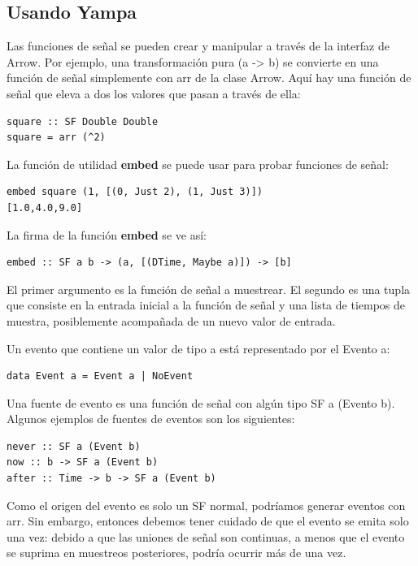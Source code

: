 \subsection{Usando Yampa}

Las funciones de señal se pueden crear y manipular a través de la interfaz de Arrow. Por ejemplo, una transformación pura (a -> b) se convierte en una función de señal simplemente con arr de la clase Arrow. Aquí hay una función de señal que eleva a dos los valores que pasan a través de ella:

\begin{lstlisting}[frame=single]
square :: SF Double Double
square = arr (^2)
\end{lstlisting}

La función de utilidad \textbf{embed}  se puede usar para probar funciones de señal:

\begin{lstlisting}[frame=single]
embed square (1, [(0, Just 2), (1, Just 3)])
[1.0,4.0,9.0]
\end{lstlisting}

La firma de la función \textbf{embed} se ve así:

\begin{lstlisting}[frame=single]
embed :: SF a b -> (a, [(DTime, Maybe a)]) -> [b]
\end{lstlisting}

El primer argumento es la función de señal a muestrear. El segundo es una tupla que consiste en la entrada inicial a la función de señal y una lista de tiempos de muestra, posiblemente acompañada de un nuevo valor de entrada.

Un evento que contiene un valor de tipo a está representado por el Evento a:

\begin{lstlisting}[frame=single]
data Event a = Event a | NoEvent
\end{lstlisting}

Una fuente de evento es una función de señal con algún tipo SF a (Evento b). Algunos ejemplos de fuentes de eventos son los siguientes:

\begin{lstlisting}[frame=single]
never :: SF a (Event b)
now :: b -> SF a (Event b)
after :: Time -> b -> SF a (Event b)
\end{lstlisting}

Como el origen del evento es solo un SF normal, podríamos generar eventos con arr. Sin embargo, entonces debemos tener cuidado de que el evento se emita solo una vez: debido a que las uniones de señal son continuas, a menos que el evento se suprima en muestreos posteriores, podría ocurrir más de una vez.

